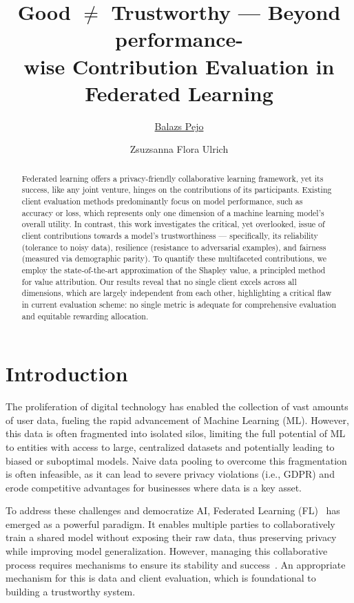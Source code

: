 \documentclass{uai2026}
\title{Good $\not=$ Trustworthy --- Beyond performance-\\wise Contribution Evaluation in Federated Learning}
\author[1,2]{\href{mailto:<pejo@crysys.hu>?Subject=Good $\not=$ Trustworthy}{Balazs Pejo}{}}
\author[1]{Zsuzsanna Flora Ulrich}
\affil[1]{%
    Department of Networked Systems and Services\\
    Budapest University of Technology and Economics
}
\affil[2]{%
    HUN-REN-BME Inf. Sys. Res. Group\\ HUN-REN Hun. Res. Network\\
    Office for Supported Res. Groups
}
\begin{document}
\maketitle

\begin{abstract}
    Federated learning offers a privacy-friendly collaborative learning framework, yet its success, like any joint venture, hinges on the contributions of its participants. Existing client evaluation methods predominantly focus on model performance, such as accuracy or loss, which represents only one dimension of a machine learning model's overall utility. In contrast, this work investigates the critical, yet overlooked, issue of client contributions towards a model's trustworthiness --- specifically, its reliability (tolerance to noisy data), resilience (resistance to adversarial examples), and fairness (measured via demographic parity). To quantify these multifaceted contributions, we employ the state-of-the-art approximation of the Shapley value, a principled method for value attribution. Our results reveal that no single client excels across all dimensions, which are largely independent from each other, highlighting a critical flaw in current evaluation scheme: no single metric is adequate for comprehensive evaluation and equitable rewarding allocation.
\end{abstract}

\section{Introduction}

The proliferation of digital technology has enabled the collection of vast amounts of user data, fueling the rapid advancement of Machine Learning (ML). However, this data is often fragmented into isolated silos, limiting the full potential of ML to entities with access to large, centralized datasets and potentially leading to biased or suboptimal models. Naive data pooling to overcome this fragmentation is often infeasible, as it can lead to severe privacy violations (i.e., GDPR) and erode competitive advantages for businesses where data is a key asset.

To address these challenges and democratize AI, Federated Learning (FL)~\cite{mcmahan2017communication} has emerged as a powerful paradigm. It enables multiple parties to collaboratively train a shared model without exposing their raw data, thus preserving privacy while improving model generalization. However, managing this collaborative process requires mechanisms to ensure its stability and success~\cite{kairouz2021advances}. An appropriate mechanism for this is data and client evaluation, which is foundational to building a trustworthy system.
\end{document}
